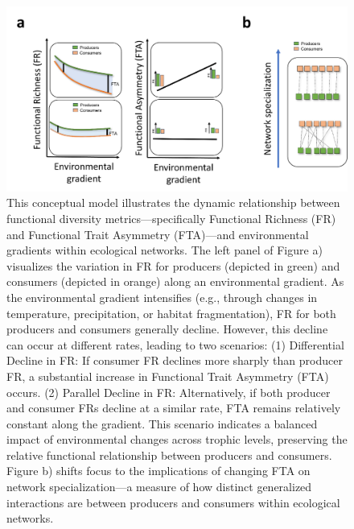 \documentclass[
]{agujournal2019}
\begin{document}
\begin{figure}[H]

{\centering \includegraphics[width=5.20833in,height=\textheight,keepaspectratio]{images/00_Figure01.png}

}

\caption{This conceptual model illustrates the dynamic relationship
between functional diversity metrics---specifically Functional Richness
(FR) and Functional Trait Asymmetry (FTA)---and environmental gradients
within ecological networks. The left panel of Figure a) visualizes the
variation in FR for producers (depicted in green) and consumers
(depicted in orange) along an environmental gradient. As the
environmental gradient intensifies (e.g., through changes in
temperature, precipitation, or habitat fragmentation), FR for both
producers and consumers generally decline. However, this decline can
occur at different rates, leading to two scenarios: (1) Differential
Decline in FR: If consumer FR declines more sharply than producer FR, a
substantial increase in Functional Trait Asymmetry (FTA) occurs. (2)
Parallel Decline in FR: Alternatively, if both producer and consumer FRs
decline at a similar rate, FTA remains relatively constant along the
gradient. This scenario indicates a balanced impact of environmental
changes across trophic levels, preserving the relative functional
relationship between producers and consumers. Figure b) shifts focus to
the implications of changing FTA on network specialization---a measure
of how distinct generalized interactions are between producers and
consumers within ecological networks.}

\end{figure}%
\end{document}

